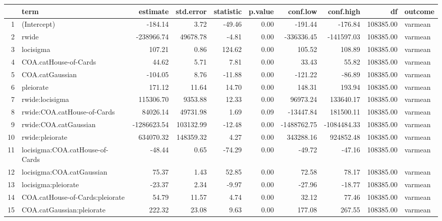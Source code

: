 \documentclass{article}
\begin{document}


\begin{table}[ht]
\centering
\begin{tabular}{rlrrrrrrrl}
  \hline
 & term & estimate & std.error & statistic & p.value & conf.low & conf.high & df & outcome \\ 
  \hline
1 & (Intercept) & -184.14 & 3.72 & -49.46 & 0.00 & -191.44 & -176.84 & 108385.00 & varmean \\ 
  2 & rwide & -238966.74 & 49678.78 & -4.81 & 0.00 & -336336.45 & -141597.03 & 108385.00 & varmean \\ 
  3 & locisigma & 107.21 & 0.86 & 124.62 & 0.00 & 105.52 & 108.89 & 108385.00 & varmean \\ 
  4 & COA.catHouse-of-Cards & 44.62 & 5.71 & 7.81 & 0.00 & 33.43 & 55.82 & 108385.00 & varmean \\ 
  5 & COA.catGaussian & -104.05 & 8.76 & -11.88 & 0.00 & -121.22 & -86.89 & 108385.00 & varmean \\ 
  6 & pleiorate & 171.12 & 11.64 & 14.70 & 0.00 & 148.31 & 193.94 & 108385.00 & varmean \\ 
  7 & rwide:locisigma & 115306.70 & 9353.88 & 12.33 & 0.00 & 96973.24 & 133640.17 & 108385.00 & varmean \\ 
  8 & rwide:COA.catHouse-of-Cards & 84026.14 & 49731.98 & 1.69 & 0.09 & -13447.84 & 181500.11 & 108385.00 & varmean \\ 
  9 & rwide:COA.catGaussian & -1286623.54 & 103132.99 & -12.48 & 0.00 & -1488762.75 & -1084484.33 & 108385.00 & varmean \\ 
  10 & rwide:pleiorate & 634070.32 & 148359.32 & 4.27 & 0.00 & 343288.16 & 924852.48 & 108385.00 & varmean \\ 
  11 & locisigma:COA.catHouse-of-Cards & -48.44 & 0.65 & -74.29 & 0.00 & -49.72 & -47.16 & 108385.00 & varmean \\ 
  12 & locisigma:COA.catGaussian & 75.37 & 1.43 & 52.85 & 0.00 & 72.58 & 78.17 & 108385.00 & varmean \\ 
  13 & locisigma:pleiorate & -23.37 & 2.34 & -9.97 & 0.00 & -27.96 & -18.77 & 108385.00 & varmean \\ 
  14 & COA.catHouse-of-Cards:pleiorate & 54.79 & 11.57 & 4.74 & 0.00 & 32.12 & 77.46 & 108385.00 & varmean \\ 
  15 & COA.catGaussian:pleiorate & 222.32 & 23.08 & 9.63 & 0.00 & 177.08 & 267.55 & 108385.00 & varmean \\ 
   \hline
\end{tabular}
\end{table}
\end{document}
